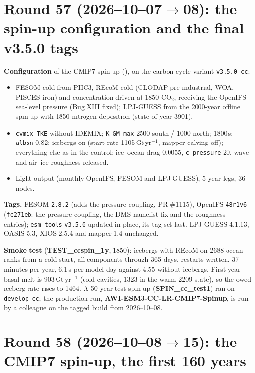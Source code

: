 \documentclass[10pt]{article}
\begin{document}
\section{Round 57 (2026--10--07$\to$08): the spin-up configuration and the final v3.5.0 tags}\label{sec:round57}

\textbf{Configuration} of the CMIP7 spin-up (), on the
carbon-cycle variant \texttt{v3.5.0-cc}:
\begin{itemize}\itemsep2pt
\item FESOM cold from PHC3, REcoM cold (GLODAP pre-industrial, WOA, PISCES iron) and concentration-driven
at 1850 CO$_2$, receiving the OpenIFS sea-level pressure (Bug XIII fixed); LPJ-GUESS from the 2000-year
offline spin-up with 1850 nitrogen deposition (state of year 3901).
\item \texttt{cvmix\_TKE} without IDEMIX; \texttt{K\_GM\_max} 2500 south / 1000 north; 1800\,s;
\texttt{albsn} 0.82; icebergs on (start rate 1105\,Gt\,yr$^{-1}$, mapper calving off); everything else as
in the control: ice--ocean drag 0.0055, \texttt{c\_pressure} 20, wave and air--ice roughness released.
\item Light output (monthly OpenIFS, FESOM and LPJ-GUESS), 5-year legs, 36 nodes.
\end{itemize}

\textbf{Tags.} FESOM \texttt{2.8.2} (adds the pressure coupling, PR \#1115), OpenIFS \texttt{48r1v6}
(\texttt{fc271eb}: the pressure coupling, the DMS namelist fix and the roughness entries);
\texttt{esm\_tools} \texttt{v3.5.0} updated in place, its tag set last. LPJ-GUESS 4.1.13, OASIS 5.3,
XIOS 2.5.4 and mapper 1.4 unchanged.

\textbf{Smoke test} (\textbf{TEST\_ccspin\_1y}, 1850): icebergs with REcoM on 2688 ocean ranks from a cold
start, all components through 365 days, restarts written. 37 minutes per year, 6.1\,s per model day
against 4.55 without icebergs. First-year basal melt is 903\,Gt\,yr$^{-1}$ (cold cavities, 1323 in the
warm 2209 state), so the owed iceberg rate rises to 1464. A 50-year test spin-up
(\textbf{SPIN\_cc\_test1}) ran on \texttt{develop-cc}; the production run,
\textbf{AWI-ESM3-CC-LR-CMIP7-Spinup}, is run by a colleague on the tagged build from 2026--10--08.

\section{Round 58 (2026--10--08$\to$15): the CMIP7 spin-up, the first 160 years}\label{sec:round58}
\end{document}
